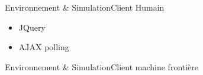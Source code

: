 
\begin{frame}{Environnement \& Simulation}{Client Humain}
\begin{itemize}
\item JQuery
\item AJAX polling
\end{itemize}
\end{frame}


\begin{frame}{Environnement \& Simulation}{Client machine frontière}

\end{frame}
